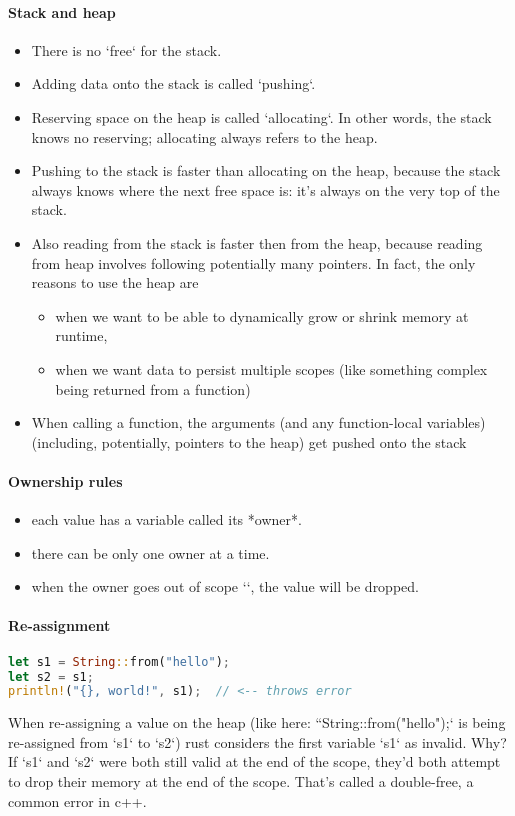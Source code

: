 \paragraph{Stack and heap}

\begin{itemize}
    \item There is no `free` for the stack.
    \item Adding data onto the stack is called `pushing`.
    \item Reserving space on the heap is called `allocating`. In other words, the stack knows no reserving; allocating always refers to the heap.
    \item Pushing to the stack is faster than allocating on the heap, because the stack always knows where the next free space is: it's always on the very top of the stack.
    \item Also reading from the stack is faster then from the heap, because reading from heap involves following potentially many pointers. In fact, the only reasons to use the heap are
    \begin{itemize}
        \item  when we want to be able to dynamically grow or shrink memory at runtime,
        \item  when we want data to persist multiple scopes (like something complex being returned from a function)
    \end{itemize}
    \item When calling a function, the arguments (and any function-local variables) (including, potentially, pointers to the heap) get pushed onto the stack
\end{itemize}

\paragraph{Ownership rules}
\begin{itemize}
    \item each value has a variable called its *owner*.
    \item there can be only one owner at a time.
    \item when the owner goes out of scope `{}`, the value will be dropped.
\end{itemize}

\paragraph{Re-assignment}
\begin{lstlisting}[language=rust]
let s1 = String::from("hello");
let s2 = s1;
println!("{}, world!", s1);  // <-- throws error
\end{lstlisting}
When re-assigning a value on the heap (like here: ``String::from("hello");` is being re-assigned from `s1` to `s2`) rust considers the first variable `s1` as invalid. Why? If `s1` and `s2` were both still valid at the end of the scope, they'd both attempt to drop their memory at the end of the scope. That's called a double-free, a common error in c++.

